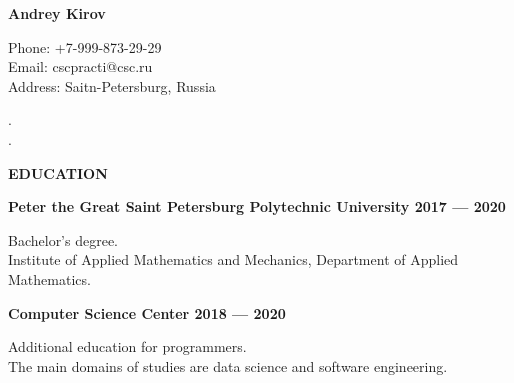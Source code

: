 \documentclass{article}
\begin{document}
\begin{minipage}{0.5\textwidth}
  \begin{flushleft}
	\Huge \bf Andrey Kirov
  \end{flushleft}
\end{minipage}
\begin{minipage}{0.5\textwidth}
  \begin{flushright}
	\normalsize
        \begin{flushright}
            Phone: +7-999-873-29-29\\ 
            Email: cscpracti@csc.ru\\
            Address: Saitn-Petersburg, Russia\\[10pt]
        \end{flushright}
  \end{flushright}
\end{minipage}
.\\[10pt]


\noindent\makebox[\linewidth]{\rule{\paperwidth}{1.2pt}}
.\\[10pt]

\begin{minipage}{0.3\textwidth}
  \begin{flushleft}
	\Large {\bf EDUCATION}
  \end{flushleft}
\end{minipage}
\begin{minipage}{0.7\textwidth}
  \begin{flushleft}
    \begin{flushleft}
            \bf{Peter the Great Saint Petersburg Polytechnic University 2017 — 2020 }
    \end{flushleft}
    
  \end{flushleft}

\begin{flushleft}
	    Bachelor’s degree.\\
        Institute of Applied Mathematics and Mechanics, Department of Applied Mathematics.\\
\end{flushleft}

\begin{flushleft}
	    {\bf Computer Science Center 2018 — 2020}\\
\end{flushleft}	    
	    

    \begin{flushleft}
	    Additional education for programmers.\\
        The main domains of studies are data science and software engineering.\\
    \end{flushleft}
\end{minipage}
\end{document}
